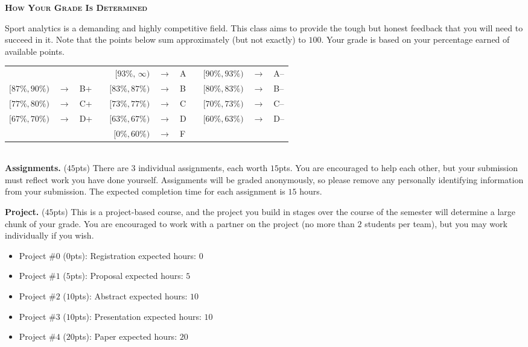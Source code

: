 \documentclass[11pt]{article}
\begin{document}
\newpage
\textbf{\textsc{How Your Grade Is Determined}}
\begin{adjustwidth}{1cm}{0cm}
	Sport analytics is a demanding and highly competitive field. This class aims to provide the tough but honest feedback that you will need to succeed in it. Note that the points below sum approximately (but not exactly) to $100$. Your grade is based on your percentage earned of available points.
  \begin{center}
    \begin{tabular}{rclcrclcrcl}
                      &               &     & & $[93\%,\,\infty)$ & $\rightarrow$ & A & & $[90\%, 93\%)$ & $\rightarrow$	& A--\\
      $[87\%, 90\%)$  & $\rightarrow$	& B+  & & $[83\%, 87\%)$  & $\rightarrow$ & B & & $[80\%, 83\%)$ & $\rightarrow$	& B--\\
      $[77\%, 80\%)$  & $\rightarrow$	& C+  & & $[73\%, 77\%)$  & $\rightarrow$ & C & & $[70\%, 73\%)$ & $\rightarrow$	& C--\\
      $[67\%, 70\%)$  & $\rightarrow$	& D+  & & $[63\%, 67\%)$  & $\rightarrow$ & D & & $[60\%, 63\%)$ & $\rightarrow$  & D--\\
                      &               &     & & $[ 0\%, 60\%)$  & $\rightarrow$ & F\\
    \end{tabular}
  \end{center}
  ~\\
	\textbf{Assignments.} ($45$pts) There are $3$ individual assignments, each worth $15$pts. You are encouraged to help each other, but your submission must reflect work you have done yourself. Assignments will be graded anonymously, so please remove any personally identifying information from your submission. The expected completion time for each assignment is $15$ hours.

  \textbf{Project.} ($45$pts) This is a project-based course, and the project you build in stages over the course of the semester will determine a large chunk of your grade. You are encouraged to work with a partner on the project (no more than $2$ students per team), but you may work individually if you wish.
  \begin{itemize}
    \item Project \#$0$ ($0$pts): Registration                   \hfill expected hours: $0$
    \item Project \#$1$ ($5$pts): Proposal                       \hfill expected hours: $5$
    \item Project \#$2$ ($10$pts): Abstract                      \hfill expected hours: $10$
    \item Project \#$3$ ($10$pts): Presentation                   \hfill expected hours: $10$
    \item Project \#$4$ ($20$pts): Paper                         \hfill expected hours: $20$
  \end{itemize}


\end{adjustwidth}
\end{document}
